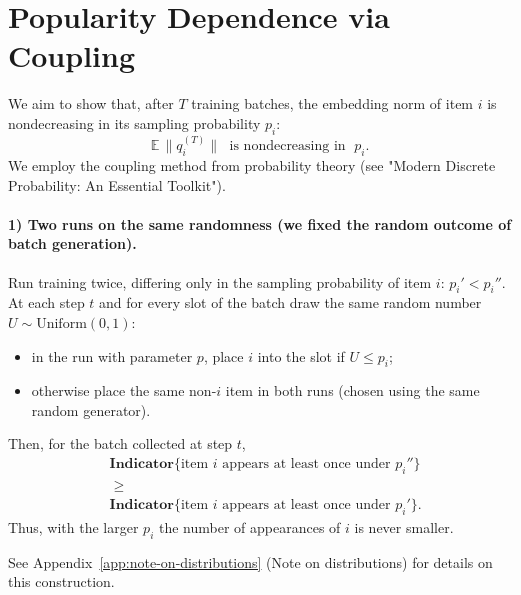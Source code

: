 \section{Popularity Dependence via Coupling}
\label{app:popularity-dependence}

We aim to show that, after $T$ training batches, the embedding norm of item $i$ is nondecreasing in its sampling probability $p_i$:
\begin{equation}
\mathbb E\,\bigl\|q_i^{(T)}\bigr\| \;\text{ is nondecreasing in }\; p_i.
\end{equation}
We employ the coupling method from probability theory (see "Modern Discrete Probability: An Essential Toolkit").

\paragraph{1) Two runs on the same randomness (we fixed the random outcome of batch generation).}
Run training twice, differing only in the sampling probability of item $i$: $p_i' < p_i''$. At each step $t$ and for every slot of the batch draw the same random number $U \sim \mathrm{Uniform}(0,1)$:
\begin{itemize}
  \item in the run with parameter $p$, place $i$ into the slot if $U \le p_i$;
  \item otherwise place the same non-$i$ item in both runs (chosen using the same random generator).
\end{itemize}
Then, for the batch collected at step $t$,
\begin{equation}
\begin{aligned}
&\mathbf{Indicator}\{\text{item } i \text{ appears at least once under } p_i''\} \\
&\;\ge\; \\
&\mathbf{Indicator}\{\text{item } i \text{ appears at least once under } p_i'\}.
\end{aligned}
\end{equation}
Thus, with the larger $p_i$ the number of appearances of $i$ is never smaller.

See Appendix~\ref{app:note-on-distributions} (Note on distributions) for details on this construction.

